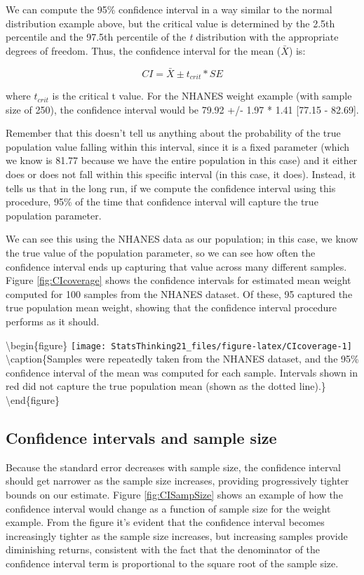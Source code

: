\documentclass[
  12pt,
]{book}
\begin{document}
We can compute the 95\% confidence interval in a way similar to the normal distribution example above, but the critical value is determined by the 2.5th percentile and the 97.5th percentile of the \emph{t} distribution with the appropriate degrees of freedom. Thus, the confidence interval for the mean (\(\bar{X}\)) is:

\[
CI = \bar{X} \pm t_{crit}*SE
\]

where \(t_{crit}\) is the critical t value.
For the NHANES weight example (with sample size of 250), the confidence interval would be 79.92 +/- 1.97 * 1.41 {[}77.15 - 82.69{]}.

Remember that this doesn't tell us anything about the probability of the true population value falling within this interval, since it is a fixed parameter (which we know is 81.77 because we have the entire population in this case) and it either does or does not fall within this specific interval (in this case, it does). Instead, it tells us that in the long run, if we compute the confidence interval using this procedure, 95\% of the time that confidence interval will capture the true population parameter.

We can see this using the NHANES data as our population; in this case, we know the true value of the population parameter, so we can see how often the confidence interval ends up capturing that value across many different samples. Figure \ref{fig:CIcoverage} shows the confidence intervals for estimated mean weight computed for 100 samples from the NHANES dataset. Of these, 95 captured the true population mean weight, showing that the confidence interval procedure performs as it should.

\textbackslash begin\{figure\}
\texttt{[image: StatsThinking21\_files/figure-latex/CIcoverage-1]} \textbackslash caption\{Samples were repeatedly taken from the NHANES dataset, and the 95\% confidence interval of the mean was computed for each sample. Intervals shown in red did not capture the true population mean (shown as the dotted line).\}\label{fig:CIcoverage}
\textbackslash end\{figure\}

\hypertarget{confidence-intervals-and-sample-size}{%
\subsection{Confidence intervals and sample size}\label{confidence-intervals-and-sample-size}}

Because the standard error decreases with sample size, the confidence interval should get narrower as the sample size increases, providing progressively tighter bounds on our estimate. Figure \ref{fig:CISampSize} shows an example of how the confidence interval would change as a function of sample size for the weight example. From the figure it's evident that the confidence interval becomes increasingly tighter as the sample size increases, but increasing samples provide diminishing returns, consistent with the fact that the denominator of the confidence interval term is proportional to the square root of the sample size.
\end{document}
